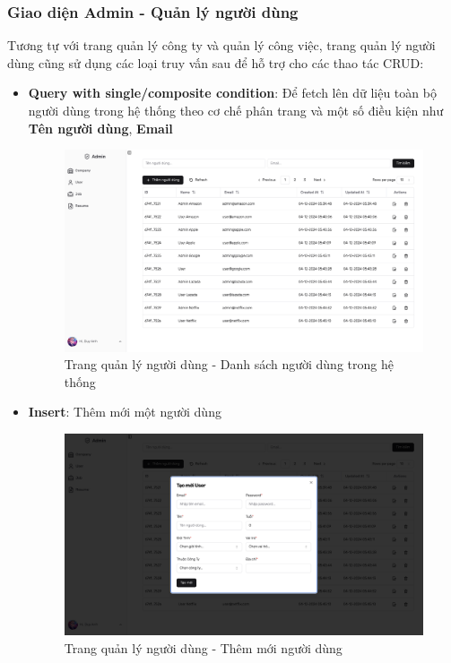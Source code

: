 \subsubsection{Giao diện Admin - Quản lý người dùng}

Tương tự với trang quản lý công ty và quản lý công việc, trang quản lý người dùng cũng sử dụng các loại truy vấn sau để hỗ trợ cho các thao tác CRUD:

\begin{itemize}
    \item \textbf{Query with single/composite condition}: Để fetch lên dữ liệu toàn bộ người dùng trong hệ thống theo cơ chế phân trang và một số điều kiện như \textbf{Tên người dùng}, \textbf{Email}
    \begin{figure}[H]
        \centering
        \includegraphics[width=\linewidth]{DBMS-Application/Images/admin-user.png}
        \caption{Trang quản lý người dùng - Danh sách người dùng trong hệ thống}
        \label{fig:enter-label}
    \end{figure}
    
    \item \textbf{Insert}: Thêm mới một người dùng
    \begin{figure}[H]
        \centering
        \includegraphics[width=\linewidth]{DBMS-Application/Images/create-user.png}
        \caption{Trang quản lý người dùng - Thêm mới người dùng}
        \label{fig:enter-label}
    \end{figure}


\end{itemize}
